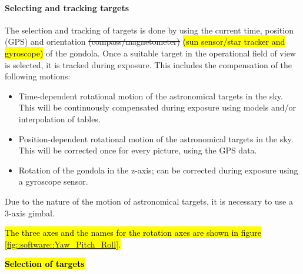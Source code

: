 \paragraph{Selecting and tracking targets}

The selection and tracking of targets is done by using the current time, position (GPS) and orientation \st{(compass/magnetometer)} \hl{(sun sensor/star tracker and gyroscope)}
of the gondola. Once a suitable target in the operational field of view is selected, it is tracked during exposure. This includes the compensation of the following motions:
\begin{itemize}
	\item Time-dependent rotational motion of the astronomical targets in the sky. This will be continuously compensated during exposure using models and/or interpolation of tables.
	\item Position-dependent rotational motion of the astronomical targets in the sky. This will be corrected once for every picture, using the GPS data.
	\item Rotation of the gondola in the z-axis; can be corrected during exposure using a gyroscope sensor.
\end{itemize}

Due to the nature of the motion of astronomical targets, it is necessary to use a 3-axis gimbal.

\hl{The three axes and the names for the rotation axes are shown in figure \mbox{\ref{fig::software::Yaw_Pitch_Roll}}.}

\textbf{\hl{Selection of targets}}

